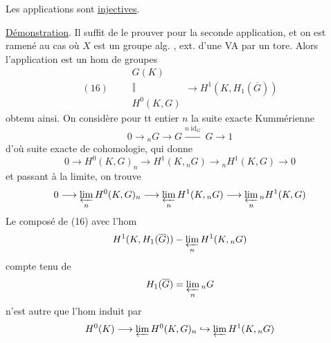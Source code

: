 Les applications sont \uline{injectives}.

\uline{Démonstration}. Il suffit de le prouver pour la seconde application, et on est ramené au cas où $X$ est  un groupe alg. , ext. d'une VA par un tore. Alors l'application est un hom de groupes
\[
(16)\qquad \begin{gathered}G(K)\\\Vert\\H^0(K,G)\end{gathered}\longrightarrow H^1(K,H_1(\overline G))
\]
obtenu ainsi. On considère pour tt entier $n$ la suite exacte Kummérienne
\[
0\longrightarrow {}_nG\longrightarrow G\xrightarrow{n\operatorname{id}_G}G\longrightarrow1
\]
d'où suite exacte de cohomologie, qui donne
\[
0\longrightarrow H^0(K,G)_n\longrightarrow H^1(K,{}_nG)\longrightarrow {}_nH^1(K,G)\longrightarrow0
\]
et passant à la limite, on trouve
\[
0\longrightarrow\varprojlim_n H^0(K,G)_n\longrightarrow\varprojlim_n H^1(K,{}_nG)\longrightarrow\varprojlim_n {}_nH^1(K,G)
\]
Le composé de (16) avec l'hom  
\[
H^1(K,H_1(\overline G))-\varprojlim_n H^1(K,{}_nG)
\]
compte tenu de
\[
H_1(\overline G)=\varprojlim_n {}_nG
\]
n'est autre que l'hom induit par
\[
H^0(K)\longrightarrow\varprojlim H^0(K,G)_n\hookrightarrow\varprojlim H^1(K,{}_nG)
\]
